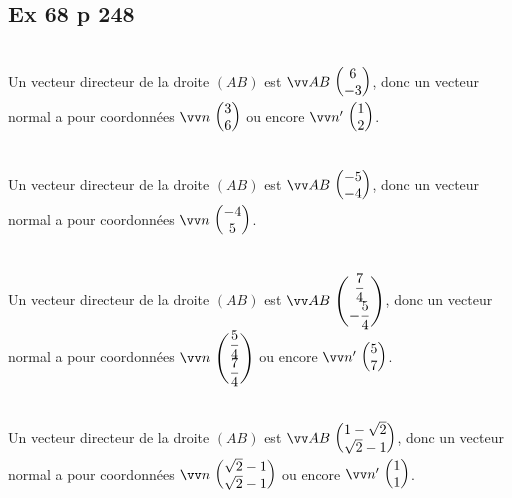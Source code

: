 \documentclass[12pt,a4paper]{book}
\begin{document}
\subsection*{Ex 68 p 248}
\begin{enumMet}
    \item {}\\
    Un vecteur directeur de la droite $(A B)$ est $\Coord{AB}{6}{-3}$, donc un vecteur normal a pour coordonnées $\Coord{n}{3}{6}$ ou encore  $\Coord{n'}{1}{2}$.
    \item  {}\\
    Un vecteur directeur de la droite $(A B)$ est $\Coord{AB}{-5}{-4}$, donc un vecteur normal a pour coordonnées $\Coord{n}{-4}{5}$.
    \item {}\\
    Un vecteur directeur de la droite $(A B)$ est $\Coord{AB}{\dfrac{7}{4}}{-\dfrac{5}{4}}$, donc un vecteur normal a pour coordonnées $\Coord{n}{\dfrac{5}{4}}{\dfrac{7}{4}}$ ou encore  $\Coord{n'}{5}{7}$.
    \item {}\\
    Un vecteur directeur de la droite $(A B)$ est $\Coord{AB}{1-\sqrt{2}}{\sqrt{2}-1}$, donc un vecteur normal a pour coordonnées $\Coord{n}{\sqrt{2}-1}{\sqrt{2}-1}$ ou encore  $\Coord{n'}{1}{1}$.
\end{enumMet}
\end{document}
